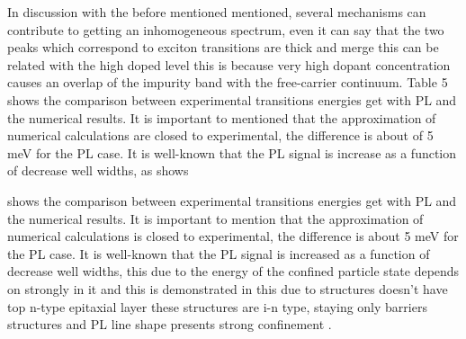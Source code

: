 In discussion with the before mentioned mentioned, several mechanisms can contribute to getting an inhomogeneous spectrum, even it can say that the two peaks which correspond to exciton transitions are thick and merge this can be related with the high doped level this is because very high dopant concentration causes an overlap of the impurity band with the free-carrier continuum\cite{kundrotas2005excitonic}. Table 5 shows the comparison between experimental transitions energies get with PL and the numerical results. It is important to mentioned that the approximation of numerical calculations are closed to experimental, the difference  is about of 5 meV for the PL case. It is well-known that the PL signal is increase as a function of decrease well widths, as shows 


 shows the comparison between experimental transitions energies get with PL and the numerical results. It is important to mention that the approximation of numerical calculations is closed to experimental, the difference is about 5 meV for the PL case. It is well-known that the PL signal is increased as a function of decrease well widths, this due to the energy of the confined particle state depends on strongly in it and this is demonstrated in  this due to structures doesn't have top n-type epitaxial layer these structures are i-n type, staying only barriers structures and PL line shape presents strong confinement \cite{singh1984theory,juang1986field,maluenda1983abrupttransitions}.



